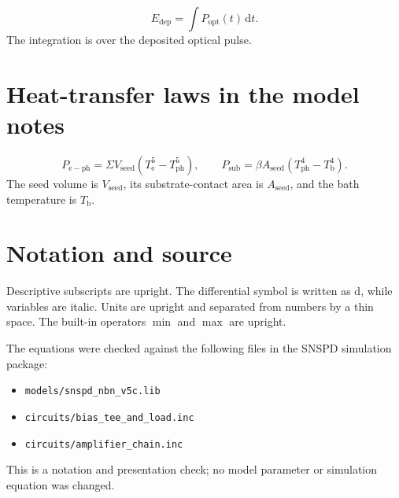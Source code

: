 \documentclass[11pt]{article}
\begin{document}
\[
E_{\mathrm{dep}}=\int P_{\mathrm{opt}}(t)\,\mathrm{d}t .
\]
The integration is over the deposited optical pulse.

\section*{Heat-transfer laws in the model notes}
\[
P_{\mathrm{e-ph}}
=\Sigma V_{\mathrm{seed}}
\left(T_{\mathrm{e}}^5-T_{\mathrm{ph}}^5\right),
\qquad
P_{\mathrm{sub}}
=\beta A_{\mathrm{seed}}
\left(T_{\mathrm{ph}}^4-T_{\mathrm{b}}^4\right) .
\]
The seed volume is $V_{\mathrm{seed}}$, its substrate-contact area is
$A_{\mathrm{seed}}$, and the bath temperature is $T_{\mathrm{b}}$.

\section*{Notation and source}
Descriptive subscripts are upright. The differential symbol is written
as $\mathrm{d}$, while variables are italic. Units are upright and
separated from numbers by a thin space. The built-in operators
$\min$ and $\max$ are upright.

The equations were checked against the following files in the SNSPD
simulation package:
\begin{itemize}
\item \texttt{models/snspd\_nbn\_v5c.lib}
\item \texttt{circuits/bias\_tee\_and\_load.inc}
\item \texttt{circuits/amplifier\_chain.inc}
\end{itemize}
This is a notation and presentation check; no model parameter or
simulation equation was changed.
\end{document}
